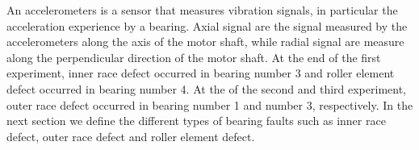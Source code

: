 \documentclass[../Main/thesis.tex]{subfiles}
\begin{document}
An accelerometers is a sensor that measures vibration signals, in particular the acceleration experience by a bearing. Axial signal are the signal measured by the accelerometers along the axis of the motor shaft, while radial signal are measure along the perpendicular direction of the motor shaft.
\justify
At the end of the first experiment, inner race defect occurred in bearing number 3 and roller element defect occurred in bearing number 4. At the of the second and third experiment, outer race defect occurred in bearing number 1 and number 3, respectively. In the next section we define the different types of bearing faults such as inner race defect, outer race defect and roller element defect. 

\end{document}
